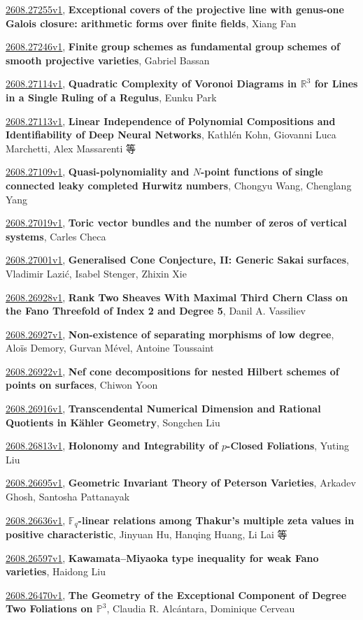 \documentclass[9pt, a4paper]{article}
\theoremstyle{plain}
\theoremstyle{definition}
\theoremstyle{remark}
\newcommand{\arxiv}[3]{\href{https://arxiv.org/abs/#1}{#1}, \textbf{\textcolor{arxivblue}{#2}}, #3}
\begin{document}
\arxiv{2608.27255v1}{Exceptional covers of the projective line with genus-one Galois closure: arithmetic forms over finite fields}{Xiang Fan}

\arxiv{2608.27246v1}{Finite group schemes as fundamental group schemes of smooth projective varieties}{Gabriel Bassan}

\arxiv{2608.27114v1}{Quadratic Complexity of Voronoi Diagrams in $\mathbb{R}^3$ for Lines in a Single Ruling of a Regulus}{Eunku Park}

\arxiv{2608.27113v1}{Linear Independence of Polynomial Compositions and Identifiability of Deep Neural Networks}{Kathlén Kohn, Giovanni Luca Marchetti, Alex Massarenti 等}

\arxiv{2608.27109v1}{Quasi-polynomiality and $N$-point functions of single connected leaky completed Hurwitz numbers}{Chongyu Wang, Chenglang Yang}

\arxiv{2608.27019v1}{Toric vector bundles and the number of zeros of vertical systems}{Carles Checa}

\arxiv{2608.27001v1}{Generalised Cone Conjecture, II: Generic Sakai surfaces}{Vladimir Lazić, Isabel Stenger, Zhixin Xie}

\arxiv{2608.26928v1}{Rank Two Sheaves With Maximal Third Chern Class on the Fano Threefold of Index 2 and Degree 5}{Danil A. Vassiliev}

\arxiv{2608.26927v1}{Non-existence of separating morphisms of low degree}{Aloïs Demory, Gurvan Mével, Antoine Toussaint}

\arxiv{2608.26922v1}{Nef cone decompositions for nested Hilbert schemes of points on surfaces}{Chiwon Yoon}

\arxiv{2608.26916v1}{Transcendental Numerical Dimension and Rational Quotients in Kähler Geometry}{Songchen Liu}

\arxiv{2608.26813v1}{Holonomy and Integrability of $p$-Closed Foliations}{Yuting Liu}

\arxiv{2608.26695v1}{Geometric Invariant Theory of Peterson Varieties}{Arkadev Ghosh, Santosha Pattanayak}

\arxiv{2608.26636v1}{$\mathbb{F}_q$-linear relations among Thakur's multiple zeta values in positive characteristic}{Jinyuan Hu, Hanqing Huang, Li Lai 等}

\arxiv{2608.26597v1}{Kawamata--Miyaoka type inequality for weak Fano varieties}{Haidong Liu}

\arxiv{2608.26470v1}{The Geometry of the Exceptional Component of Degree Two Foliations on $\mathbb{P}^3$}{Claudia R. Alcántara, Dominique Cerveau}
\end{document}
